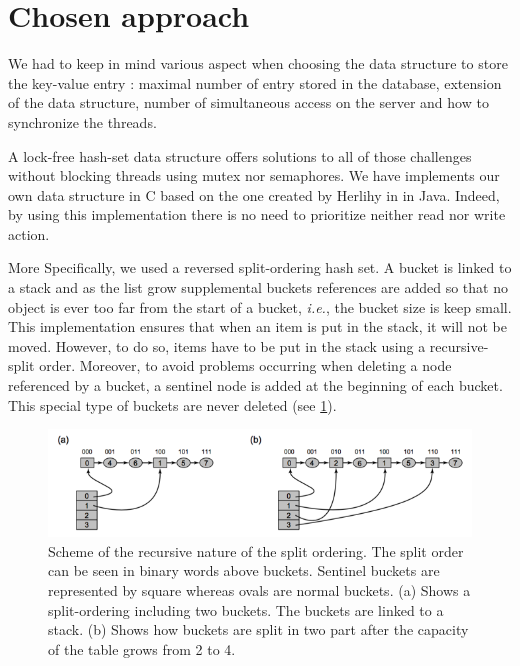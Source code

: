 \documentclass[a4paper,11pt]{report}
\begin{document}
    \section*{Chosen approach}

    We had to keep in mind various aspect when choosing the data structure to
    store the key-value entry : maximal number of entry stored in the database,
    extension of the data structure, number of simultaneous access on the server and
    how to synchronize the threads.

    A lock-free hash-set data structure offers solutions to all of those challenges without blocking threads using mutex
    nor semaphores. We have implements our own data structure in C based on the one created by Herlihy in
    \cite{Herlihy2006} in Java. Indeed, by using this implementation there is no need to prioritize neither read nor write action.

    More Specifically, we used a reversed split-ordering hash set.
    A bucket is linked to a stack and as the list grow supplemental buckets references are added so that
    no object is ever too far from the start of a bucket, \textit{i.e.}, the bucket size is keep small.
    This implementation ensures that when an item is put in the stack, it will not be moved.
    However, to do so, items have to be put in the stack using a recursive-split order.
    Moreover, to avoid problems occurring when deleting a node referenced by a bucket, a sentinel node is added
    at the beginning of each bucket. This special type of buckets are never deleted (see \ref{fig:Fig1}).

    \begin{figure}[h]
        \centering
            \includegraphics{images/hashsetFig1.png}
        \caption{Scheme of the recursive nature of the split ordering.
        The split order can be seen in binary words above buckets.
        Sentinel buckets are represented by square whereas ovals are normal buckets.
        (a) Shows a split-ordering including two buckets. The buckets are linked to a stack.
        (b) Shows how buckets are split in two part after the capacity of the table grows from 2 to 4.}
        \label{fig:Fig1}
    \end{figure}
\end{document}

